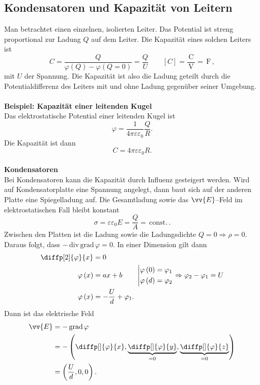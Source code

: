 \documentclass[a4paper,12pt]{article}
\begin{document}
\subsection{Kondensatoren und Kapazität von Leitern}
Man betrachtet einen einzelnen, isolierten Leiter. Das Potential ist streng proportional zur Ladung $Q$ auf dem Leiter. Die Kapazität eines solchen Leiters ist
\[ 
        C=\dfrac{Q}{\varphi \left(Q\right)-\varphi \left(Q=0\right)}=\dfrac{Q}{U}\qquad \left[C\right]=\dfrac{\,\text{C}\,}{\,\text{V}\,}=\,\text{F}\,
,\] 
mit $U$ der Spannung. Die Kapazität ist also die Ladung geteilt durch die Potentialdifferenz des Leiters mit und ohne Ladung gegenüber seiner Umgebung.
\\\hfill\\\textbf{Beispiel: Kapazität einer leitenden Kugel}\\ 
Das elektrostatische Potential einer leitenden Kugel ist
\[ 
        \varphi =\dfrac{1}{4\pi \varepsilon \varepsilon _0}\dfrac{Q}{R}
.\] 
Die Kapazität ist dann
\[ 
        C=4\pi \varepsilon \varepsilon _0R
.\] 
\hfill\\\textbf{Kondensatoren}\\ 
Bei Kondensatoren kann die Kapazität durch Influenz gesteigert werden. Wird auf Kondensatorplatte eine Spannung angelegt, dann baut sich auf der anderen Platte eine Spiegelladung auf. Die Gesamtladung sowie das $\vv{E}$--Feld im elektrostatischen Fall bleibt konstant
\[ 
        \sigma =\varepsilon \varepsilon _0E=\dfrac{Q}{A}=\,\text{const.}\,
.\] 
Zwischen den Platten ist die Ladung sowie die Ladungsdichte $Q=0\Rightarrow \rho =0$. Daraus folgt, dass $-\,\text{div}\,\text{grad}\,\varphi =0$. In einer Dimension gilt dann
\begin{align*}
        \diffp[2]{\varphi }{x}&=0\\
        \varphi \left(x\right)&=ax+b\qquad \left|\begin{aligned}
                \varphi \left(0\right)&=\varphi _1\\\varphi \left(d\right)&=\varphi _2
        \end{aligned}\right.\Rightarrow \varphi _2-\varphi _1=U\\
        \varphi \left(x\right)&=-\dfrac{U}{d}+\varphi _1
.\end{align*}
Dann ist das elektrische Feld
\begin{align*}
        \vv{E}&=-\,\text{grad}\,\varphi \\
              &=-\left(\diffp[]{\varphi }{x},\underbrace{\diffp[]{\varphi }{y}}_{=0},\underbrace{\diffp[]{\varphi }{z}}_{=0}\right)\\
              &=\left(\dfrac{U}{d},0,0\right)
.\end{align*}
\end{document}
